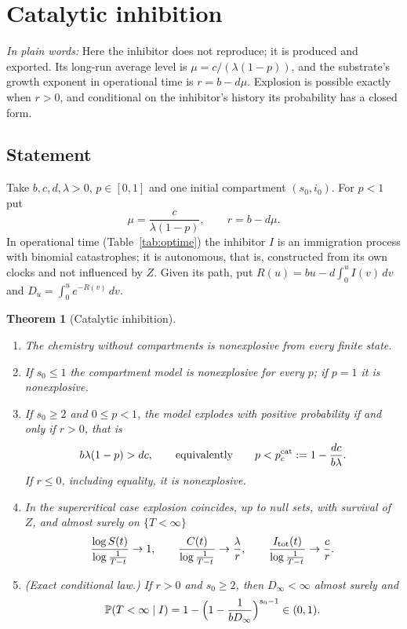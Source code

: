 \documentclass[11pt,a4paper]{article}
\numberwithin{equation}{section}
\newtheorem{theorem}{Theorem}[section]
\theoremstyle{definition}\newtheorem{definition}[theorem]{Definition}
\theoremstyle{remark}\newtheorem{remark}[theorem]{Remark}\newtheorem{example}[theorem]{Example}
\renewcommand{\P}{\mathbb P}
\newcommand{\takeaway}[1]{\par\smallskip\noindent\textit{In plain words:} #1\par\smallskip}
\begin{document}
\section{Catalytic inhibition}\label{sec:catalytic}
\takeaway{Here the inhibitor does not reproduce; it is produced and exported. Its long-run average level is $\mu=c/(\lambda(1-p))$, and the substrate's growth exponent in operational time is $r=b-d\mu$. Explosion is possible exactly when $r>0$, and conditional on the inhibitor's history its probability has a closed form.}

\subsection{Statement}
Take $b,c,d,\lambda>0$, $p\in[0,1]$ and one initial compartment $(s_0,i_0)$. For $p<1$ put
\[
\mu=\frac{c}{\lambda(1-p)},\qquad r=b-d\mu .
\]
In operational time (Table~\ref{tab:optime}) the inhibitor $I$ is an immigration process with binomial catastrophes; it is autonomous, that is, constructed from its own clocks and not influenced by $Z$. Given its path, put $R(u)=bu-d\int_0^uI(v)\,dv$ and $D_u=\int_0^ue^{-R(v)}\,dv$.

\begin{theorem}[Catalytic inhibition]\label{thm:catalytic}
\leavevmode
\begin{enumerate}[label=(\alph*)]
\item The chemistry without compartments is nonexplosive from every finite state.
\item If $s_0\le1$ the compartment model is nonexplosive for every $p$; if $p=1$ it is nonexplosive.
\item If $s_0\ge2$ and $0\le p<1$, the model explodes with positive probability if and only if $r>0$, that is
\begin{equation}\label{eq:cat-threshold}
b\lambda(1-p)>dc,\qquad\text{equivalently}\qquad p<p_c^{\rm cat}:=1-\frac{dc}{b\lambda}.
\end{equation}
If $r\le0$, including equality, it is nonexplosive.
\item In the supercritical case explosion coincides, up to null sets, with survival of $Z$, and almost surely on $\{T<\infty\}$
\[
\frac{\log S(t)}{\log\frac1{T-t}}\to1,\qquad \frac{C(t)}{\log\frac1{T-t}}\to\frac\lambda r,\qquad\frac{I_{\rm tot}(t)}{\log\frac1{T-t}}\to\frac cr .
\]
\item (Exact conditional law.) If $r>0$ and $s_0\ge2$, then $D_\infty<\infty$ almost surely and
\begin{equation}\label{eq:cat-law}
\P(T<\infty\mid I)=1-\Bigl(1-\frac1{bD_\infty}\Bigr)^{s_0-1}\in(0,1).
\end{equation}
\end{enumerate}
\end{theorem}
\end{document}
